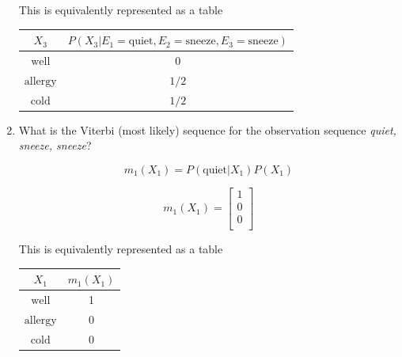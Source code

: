 \documentclass[12pt]{article}
\begin{document}
\begin{enumerate}
  This is equivalently represented as a table

  \begin{center}
    \begin{tabular}{|c|c|}
      \hline
      $X_3$ & $P(X_3|E_1=\text{quiet},E_2=\text{sneeze},E_3=\text{sneeze})$ \\
      \hline
      $\text{well}$ & 0 \\
      \hline
      $\text{allergy}$ & $1/2$ \\
      \hline
      $\text{cold}$ & $1/2$ \\
      \hline
    \end{tabular}
  \end{center}

\item What is the Viterbi (most likely) sequence for the observation
  sequence {\it quiet, sneeze, sneeze}?

  \[
    m_1(X_1) = P(\text{quiet}|X_1) P(X_1)
  \]
  
  \[
    m_1(X_1) =
    \begin{bmatrix}
      1 \\
      0 \\
      0 \\
    \end{bmatrix}
  \]

  This is equivalently represented as a table

  \begin{center}
    \begin{tabular}{|c|c|}
      \hline
      $X_1$ & $m_1(X_1)$ \\
      \hline
      $\text{well}$ & 1 \\
      \hline
      $\text{allergy}$ & 0 \\
      \hline
      $\text{cold}$ & 0 \\
      \hline
    \end{tabular}
  \end{center}


\end{enumerate}
\end{document}
